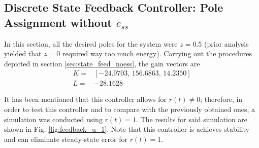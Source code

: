     \subsection{Discrete State Feedback Controller: Pole Assignment without $e_{ss}$}
    In this section, all the desired poles for the system were $z=0.5$ (prior analysis yielded that $z=0$ required way too much energy). Carrying out the procedures depicted in section \ref{sec:state_feed_noess}, the gain vectors are
	\begin{equation}
	\begin{split}
	    K=&[-24.9703,\,156.6863,\,14.2350]\\
	    L=&-28.1628
	\end{split}
	\end{equation}
	
	It has been mentioned that this controller allows for $r(t)\neq0$; therefore, in order to test this controller and to compare with the previously obtained ones, a simulation was conducted using $r(t)=1$. The results for said simulation are shown in Fig. \ref{fig:feedback_u_1}. Note that this controller is achieves stability and can eliminate steady-state error for $r(t)=1$.
	
